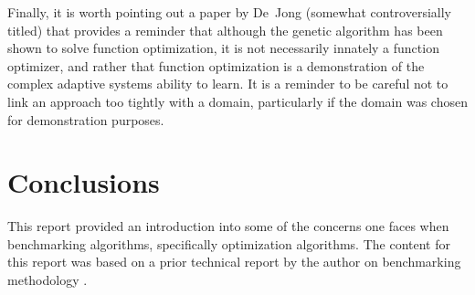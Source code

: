 \documentclass[a4paper, 11pt]{article}
\begin{document}
Finally, it is worth pointing out a paper by De~Jong \cite{Jong1992} (somewhat controversially titled) that provides a reminder that although the genetic algorithm has been shown to solve function optimization, it is not necessarily innately a function optimizer, and rather that function optimization is a demonstration of the complex adaptive systems ability to learn. It is a reminder to be careful not to link an approach too tightly with a domain, particularly if the domain was chosen for demonstration purposes.

\section{Conclusions}
\label{sec:conclusions}
This report provided an introduction into some of the concerns one faces when benchmarking algorithms, specifically optimization algorithms.
The content for this report was based on a prior technical report by the author on benchmarking methodology \cite{Brownlee2007f}.



\end{document}
